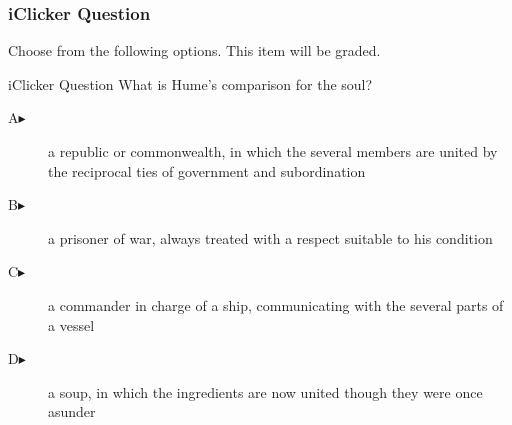 \begin{frame}
  \frametitle{iClicker Question}
Choose from the following options. This item will be graded.
\begin{block}{iClicker Question}
What is Hume's comparison for the soul?
\end{block}
\begin{description}
\item[A\hspace{.2in}$\blacktriangleright$] a republic or commonwealth, in which the several members are united by the reciprocal ties of government and subordination
\item[B\hspace{.2in}$\blacktriangleright$] a prisoner of war, always treated with a respect suitable to his condition
\item[C\hspace{.2in}$\blacktriangleright$] a commander in charge of a ship, communicating with the several parts of a vessel
\item[D\hspace{.2in}$\blacktriangleright$] a soup, in which the ingredients are now united though they were once asunder
\end{description}
\end{frame}
